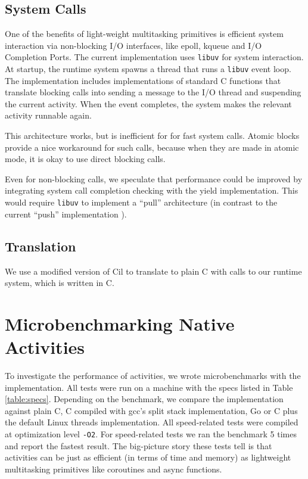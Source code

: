 \documentclass[acmsmall,anonymous,review]{acmart}\settopmatter{printfolios=true,printccs=false,printacmref=false}
\begin{document}
\subsection{System Calls}

One of the benefits of light-weight multitasking primitives is efficient system interaction via non-blocking I/O interfaces, like epoll, kqueue and I/O Completion Ports.
The current \charcoal{} implementation uses \texttt{libuv} for system interaction.
At startup, the runtime system spawns a thread that runs a \texttt{libuv} event loop.
The \charcoal{} implementation includes implementations of standard C functions that translate blocking calls into sending a message to the I/O thread and suspending the current activity.
When the event completes, the system makes the relevant activity runnable again.

This architecture works, but is inefficient for for fast system calls.
Atomic blocks provide a nice workaround for such calls, because when they are made in atomic mode, it is okay to use direct blocking calls.

Even for non-blocking calls, we speculate that performance could be improved by integrating system call completion checking with the yield implementation.
This would require \texttt{libuv} to implement a ``pull'' architecture (in contrast to the current ``push'' implementation \cite{libuv2014}).

\subsection{Translation}

We use a modified version of Cil \cite{Necula2002} to translate \charcoal{} to plain C with calls to our runtime system, which is written in C.

\section{Microbenchmarking Native Activities}

To investigate the performance of activities, we wrote microbenchmarks with the \charcoal{} implementation.
All tests were run on a machine with the specs listed in Table \ref{table:specs}.
Depending on the benchmark, we compare the \charcoal{} implementation against plain C, C compiled with gcc's split stack implementation, Go or C plus the default Linux threads implementation.
All speed-related tests were compiled at optimization level \texttt{-O2}.
For speed-related tests we ran the benchmark 5 times and report the fastest result.
The big-picture story these tests tell is that activities can be just as efficient (in terms of time and memory) as lightweight multitasking primitives like coroutines and async functions.
\end{document}
